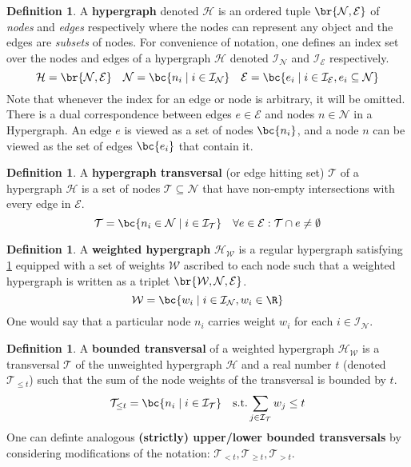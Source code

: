 \documentclass[aps, 10pt, english, twoside, pra, longbibliography]{revtex4-1}
\theoremstyle{plain}
\theoremstyle{definition}
\newtheorem{definition}[theorem]{Definition}
\theoremstyle{remark}
\newcommand{\hgraph}{\mathcal{H}}
\newcommand{\nodes}{\mathcal{N}}
\newcommand{\weights}{\mathcal{W}}
\newcommand{\edges}{\mathcal{E}}
\newcommand{\trans}{\mathcal{T}}
\newcommand{\ind}{\mathcal{I}}
\newcommand{\term}[1]{\textcolor{Mahogany}{\textbf{#1}}}
\begin{document}
    \begin{definition}
        \label{def:hypergraph}
        A \term{hypergraph} denoted $\hgraph$ is an ordered tuple $\br{\nodes, \edges}$ of \textit{nodes} and \textit{edges} respectively where the nodes can represent any object and the edges are \textit{subsets} of nodes. For convenience of notation, one defines an index set over the nodes and edges of a hypergraph $\hgraph$ denoted $\ind_\nodes$ and $\ind_\edges$ respectively.
        \[ \hgraph = \br{\nodes, \edges} \quad \nodes = \bc{n_i \mid i \in \ind_\nodes} \quad \edges = \bc{e_i \mid i \in \ind_\edges, e_i \subseteq \nodes} \]
        Note that whenever the index for an edge or node is arbitrary, it will be omitted. There is a dual correspondence between edges $e \in \edges$ and nodes $n \in \nodes$ in a Hypergraph. An edge $e$ is viewed as a set of nodes $\bc{n_i}$, and a node $n$ can be viewed as the set of edges $\bc{e_i}$ that contain it.
    \end{definition}

    \begin{definition}
        A \term{hypergraph transversal} (or edge hitting set) $\trans$ of a hypergraph $\hgraph$ is a set of nodes $\trans \subseteq \nodes$ that have non-empty intersections with every edge in $\edges$.
        \[ \trans = \bc{n_i \in \nodes \mid i \in \ind_\trans } \quad \forall e \in \edges : \trans \cap e \neq \emptyset \]
    \end{definition}

    \begin{definition}
        A \term{weighted hypergraph} $\hgraph_\weights$ is a regular hypergraph satisfying \cref{def:hypergraph} equipped with a set of weights $\weights$ ascribed to each node such that a weighted hypergraph is written as a triplet $\br{\weights, \nodes, \edges}$.
        \[ \weights = \bc{w_i \mid i \in \ind_\nodes, w_i \in \R} \]
        One would say that a particular node $n_i$ carries weight $w_i$ for each $i \in \ind_\nodes$.
    \end{definition}

    \begin{definition}
        A \term{bounded transversal} of a weighted hypergraph $\hgraph_\weights$ is a transversal $\trans$ of the unweighted hypergraph $\hgraph$ and a real number $t$ (denoted $\trans_{\leq t}$) such that the sum of the node weights of the transversal is bounded by $t$.
        \[ \trans_{\leq t} = \bc{n_i \mid i \in \ind_\trans} \quad \text{s.t.} \sum_{j\in\ind_\trans} w_j \leq t \]
        One can definte analogous \term{(strictly) upper/lower bounded transversals} by considering modifications of the notation: $\trans_{< t}, \trans_{\geq t}, \trans_{> t}$.
    \end{definition}
\end{document}
